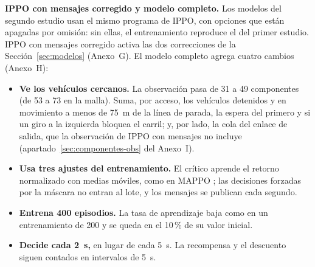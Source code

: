\noindent\textbf{IPPO con mensajes corregido y modelo completo.} Los
modelos del segundo estudio usan el mismo programa de IPPO, con
opciones que están apagadas por omisión: sin ellas, el entrenamiento
reproduce el del primer estudio. IPPO con mensajes corregido activa las
dos correcciones de la Sección~\ref{sec:modelos} (Anexo~G). El modelo
completo agrega cuatro cambios (Anexo~H):
\begin{itemize}
  \item \textbf{Ve los vehículos cercanos.} La observación pasa de 31 a
    49 componentes (de 53 a 73 en la malla). Suma, por acceso, los
    vehículos detenidos y en movimiento a menos de 75~m de la línea de
    parada, la espera del primero y si un giro a la izquierda bloquea
    el carril; y, por lado, la cola del enlace de salida, que la
    observación de IPPO con mensajes no incluye
    (apartado~\ref{sec:componentes-obs} del Anexo~I).
  \item \textbf{Usa tres ajustes del entrenamiento.} El crítico aprende
    el retorno normalizado con medias móviles, como en MAPPO
    \citep{Yu2021_MAPPO}; las decisiones forzadas por la máscara no
    entran al lote, y los mensajes se publican cada segundo.
  \item \textbf{Entrena 400 episodios.} La tasa de aprendizaje baja
    como en un entrenamiento de 200 y se queda en el 10\,\% de su valor
    inicial.
  \item \textbf{Decide cada 2~s,} en lugar de cada 5~s. La recompensa y
    el descuento siguen contados en intervalos de 5~s.
\end{itemize}

